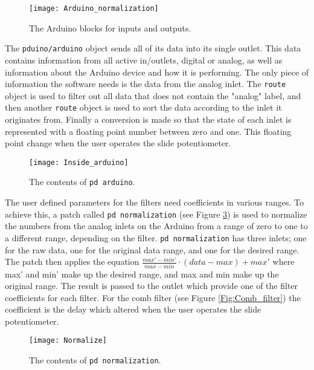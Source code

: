 \begin{figure}
\centering
\texttt{[image: Arduino\_normalization]}
\caption{The Arduino blocks for inputs and outputs.}
\label{Fig:Arudino_normalization}
\end{figure}

The \texttt{pduino/arduino} object sends all of its data into its single outlet. This data contains information from all active in/outlets, digital or analog, as well as information about the Arduino device and how it is performing. The only piece of information the software needs is the data from the analog inlet. The \texttt{route} object is used to filter out all data that does not contain the "analog" label, and then another \texttt{route} object is used to sort the data according to the inlet it originates from. Finally a conversion is made so that the state of each inlet is represented with a floating point number between zero and one. This floating point change when the user operates the slide potentiometer.


\begin{figure}
\centering
\texttt{[image: Inside\_arduino]}
\caption{The contents of \texttt{pd arduino}.}
\label{Fig:Inside_arduino}
\end{figure}

The user defined parameters for the filters need coefficients in various ranges. To achieve this, a patch called \texttt{pd normalization} (see Figure \ref{Fig:Normalize}) is used to normalize the numbers from the analog inlets on the Arduino from a range of zero to one to a different range, depending on the filter. \texttt{pd normalization} has three inlets; one for the raw data, one for the original data range, and one for the desired range. The patch then applies the equation $\frac{max'-min'}{max-min}\cdot (data-max)+max'$ where max' and min' make up the desired range, and max and min make up the original range. The result is passed to the outlet which provide one of the filter coefficients for each filter. For the comb filter (see Figure \ref{Fig:Comb_filter}) the coefficient is the delay which altered when the user operates the slide potentiometer. 

\begin{figure}
\centering
\texttt{[image: Normalize]}
\caption{The contents of \texttt{pd normalization}.}
\label{Fig:Normalize}
\end{figure}